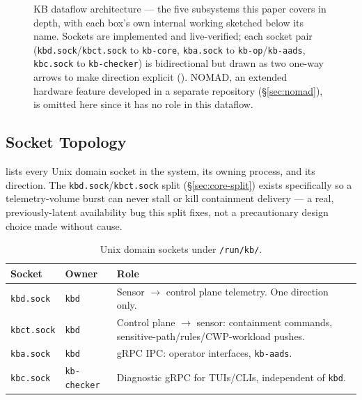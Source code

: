 \documentclass{article}
\begin{document}
\begin{figure}[t]
\caption{KB dataflow architecture --- the five subsystems this paper
covers in depth, with each box's own internal working sketched below
its name. Sockets are implemented and live-verified; each socket pair
(\texttt{kbd.sock}/\texttt{kbct.sock} to \texttt{kb-core},
\texttt{kba.sock} to \texttt{kb-op}/\texttt{kb-aads}, \texttt{kbc.sock}
to \texttt{kb-checker}) is bidirectional but drawn as two one-way
arrows to make direction explicit (). NOMAD, an
extended hardware feature developed in a separate repository
(\S\ref{sec:nomad}), is omitted here since it has no role in this
dataflow.}
\label{fig:dataflow}
\end{figure}

\subsection{Socket Topology}

 lists every Unix domain socket in the system, its
owning process, and its direction. The \texttt{kbd.sock}/\texttt{kbct.sock}
split (\S\ref{sec:core-split}) exists specifically so a telemetry-volume
burst can never stall or kill containment delivery --- a real,
previously-latent availability bug this split fixes, not a
precautionary design choice made without cause.

\begin{table}[h]
\centering
\caption{Unix domain sockets under \texttt{/run/kb/}.}
\label{tab:sockets}
\begin{tabular}{@{}p{1.65cm}p{1.75cm}p{3.4cm}@{}}
\toprule
Socket & Owner & Role \\
\midrule
\texttt{kbd.sock} & \texttt{kbd} & Sensor $\to$ control plane telemetry. One direction only. \\
\texttt{kbct.sock} & \texttt{kbd} & Control plane $\to$ sensor: containment commands, sensitive-path/rules/CWP-workload pushes. \\
\texttt{kba.sock} & \texttt{kbd} & gRPC IPC: operator interfaces, \texttt{kb-aads}. \\
\texttt{kbc.sock} & \texttt{kb-checker} & Diagnostic gRPC for TUIs/CLIs, independent of \texttt{kbd}. \\
\bottomrule
\end{tabular}
\end{table}
\end{document}
